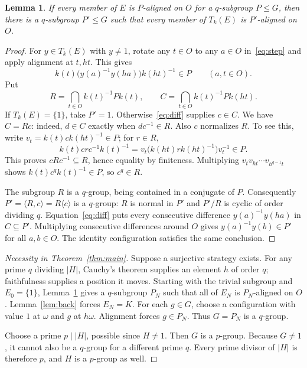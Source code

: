 \documentclass[11pt]{article}
\newtheorem{lemma}[theorem]{Lemma}
\begin{document}
\begin{lemma}\label{lem:coset}
If every member of $E$ is $P$-aligned on $O$ for a $q$-subgroup $P\leq G$,
then there is a $q$-subgroup $P'\leq G$ such that every member of
$T_k(E)$ is $P'$-aligned on $O$.
\end{lemma}
\begin{proof}
For $y\in T_k(E)$ with $y\neq1$, rotate any $t\in O$ to any $a\in O$
in~\eqref{eq:step} and apply alignment at $t,ht$. This gives
\begin{equation}\label{eq:diff}
 k(t)\bigl(y(a)^{-1}y(ha)\bigr)k(ht)^{-1}\in P
 \qquad(a,t\in O).
\end{equation}
Put
\[
 R=\bigcap_{t\in O}k(t)^{-1}Pk(t),\qquad
 C=\bigcap_{t\in O}k(t)^{-1}Pk(ht).
\]
If $T_k(E)=\{1\}$, take $P'=1$. Otherwise~\eqref{eq:diff} supplies
$c\in C$. We have $C=Rc$: indeed, $d\in C$ exactly when
$d c^{-1}\in R$. Also $c$ normalizes $R$. To see this, write
$v_t=k(t)c k(ht)^{-1}\in P$; for $r\in R$,
\[
 k(t)c r c^{-1}k(t)^{-1}
   =v_t\bigl(k(ht)r k(ht)^{-1}\bigr)v_t^{-1}\in P.
\]
This proves $cRc^{-1}\subseteq R$, hence equality by finiteness.
Multiplying $v_t v_{ht}\cdots v_{h^{q-1}t}$ shows
$k(t)c^q k(t)^{-1}\in P$, so $c^q\in R$.

The subgroup $R$ is a $q$-group, being contained in a conjugate of $P$.
Consequently $P'=\langle R,c\rangle=R\langle c\rangle$ is a $q$-group:
$R$ is normal in $P'$ and $P'/R$ is cyclic of order dividing $q$.
Equation~\eqref{eq:diff} puts every consecutive difference
$y(a)^{-1}y(ha)$ in $C\subseteq P'$. Multiplying consecutive differences
around $O$ gives $y(a)^{-1}y(b)\in P'$ for all $a,b\in O$.
The identity configuration satisfies the same conclusion.
\end{proof}

\begin{proof}[Necessity in Theorem~\ref{thm:main}]
Suppose a surjective strategy exists. For any prime $q$ dividing $|H|$,
Cauchy's theorem supplies an element $h$ of order $q$; faithfulness supplies
a position it moves. Starting with the trivial subgroup and $E_0=\{1\}$,
Lemma~\ref{lem:coset} gives a $q$-subgroup $P_N$ such that all of $E_N$
is $P_N$-aligned on $O$. Lemma~\ref{lem:back} forces $E_N=K$.
For each $g\in G$, choose a configuration with value $1$ at $\omega$ and
$g$ at $h\omega$. Alignment forces $g\in P_N$. Thus $G=P_N$ is a
$q$-group.

Choose a prime $p\mid |H|$, possible since $H\neq1$. Then $G$ is a
$p$-group. Because $G\neq1$, it cannot also be a $q$-group for a different
prime $q$. Every prime divisor of $|H|$ is therefore $p$, and $H$ is a
$p$-group as well.
\end{proof}
\end{document}

